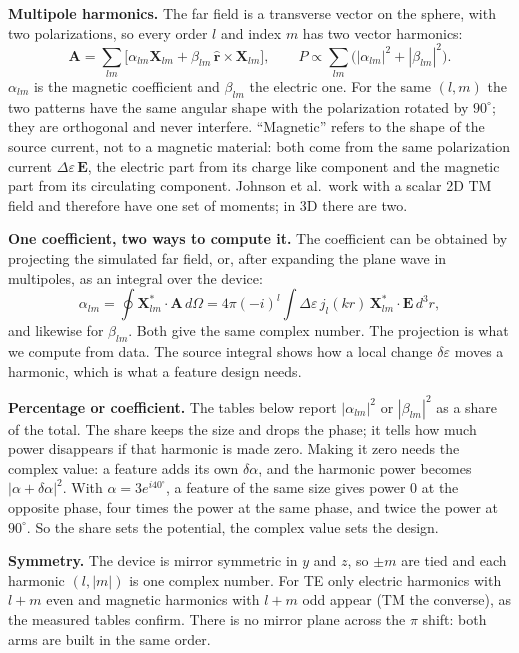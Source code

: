 \documentclass[11pt]{article}
\begin{document}
\textbf{Multipole harmonics.} The far field is a transverse vector on the sphere, with two polarizations, so every order $l$ and index $m$ has two vector harmonics:
\begin{equation}
\mathbf A=\sum_{lm}\bigl[\alpha_{lm}\mathbf X_{lm}+\beta_{lm}\,\hat{\mathbf r}\times\mathbf X_{lm}\bigr],\qquad P\propto\sum_{lm}\bigl(|\alpha_{lm}|^2+|\beta_{lm}|^2\bigr).
\end{equation}
$\alpha_{lm}$ is the magnetic coefficient and $\beta_{lm}$ the electric one. For the same $(l,m)$ the two patterns have the same angular shape with the polarization rotated by $90^\circ$; they are orthogonal and never interfere. ``Magnetic'' refers to the shape of the source current, not to a magnetic material: both come from the same polarization current $\Delta\varepsilon\,\mathbf E$, the electric part from its charge like component and the magnetic part from its circulating component. Johnson et al.\ work with a scalar 2D TM field and therefore have one set of moments; in 3D there are two.

\textbf{One coefficient, two ways to compute it.} The coefficient can be obtained by projecting the simulated far field, or, after expanding the plane wave in multipoles, as an integral over the device:
\begin{equation}
\alpha_{lm}=\oint\mathbf X^*_{lm}\cdot\mathbf A\,d\Omega
=4\pi(-i)^l\int\Delta\varepsilon\,j_l(kr)\,\mathbf X^*_{lm}\cdot\mathbf E\,d^3r ,
\label{eq:twoways}
\end{equation}
and likewise for $\beta_{lm}$. Both give the same complex number. The projection is what we compute from data. The source integral shows how a local change $\delta\varepsilon$ moves a harmonic, which is what a feature design needs.

\textbf{Percentage or coefficient.} The tables below report $|\alpha_{lm}|^2$ or $|\beta_{lm}|^2$ as a share of the total. The share keeps the size and drops the phase; it tells how much power disappears if that harmonic is made zero. Making it zero needs the complex value: a feature adds its own $\delta\alpha$, and the harmonic power becomes $|\alpha+\delta\alpha|^2$. With $\alpha=3e^{i40^\circ}$, a feature of the same size gives power 0 at the opposite phase, four times the power at the same phase, and twice the power at $90^\circ$. So the share sets the potential, the complex value sets the design.

\textbf{Symmetry.} The device is mirror symmetric in $y$ and $z$, so $\pm m$ are tied and each harmonic $(l,|m|)$ is one complex number. For TE only electric harmonics with $l+m$ even and magnetic harmonics with $l+m$ odd appear (TM the converse), as the measured tables confirm. There is no mirror plane across the $\pi$ shift: both arms are built in the same order.
\end{document}
